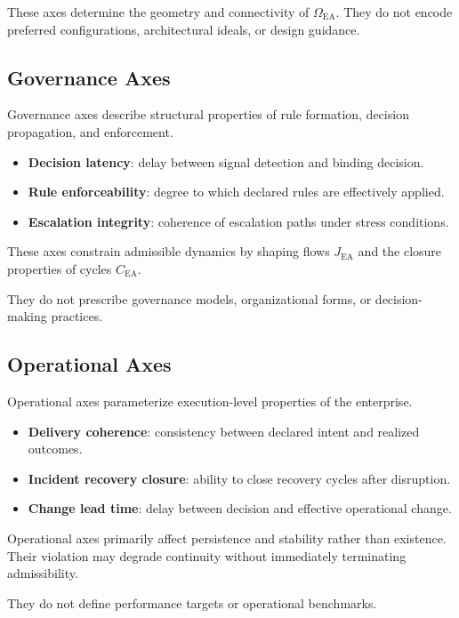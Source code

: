 These axes determine the geometry and connectivity of
$\Omega_{\mathrm{EA}}$.
They do not encode preferred configurations, architectural ideals, or
design guidance.

\subsection{Governance Axes}

Governance axes describe structural properties of rule formation,
decision propagation, and enforcement.

\begin{itemize}
  \item \textbf{Decision latency}: delay between signal detection and
        binding decision.
  \item \textbf{Rule enforceability}: degree to which declared rules are
        effectively applied.
  \item \textbf{Escalation integrity}: coherence of escalation paths
        under stress conditions.
\end{itemize}

These axes constrain admissible dynamics by shaping flows $J_{\mathrm{EA}}$
and the closure properties of cycles $C_{\mathrm{EA}}$.

They do not prescribe governance models, organizational forms, or
decision-making practices.

\subsection{Operational Axes}

Operational axes parameterize execution-level properties of the
enterprise.

\begin{itemize}
  \item \textbf{Delivery coherence}: consistency between declared intent
        and realized outcomes.
  \item \textbf{Incident recovery closure}: ability to close recovery
        cycles after disruption.
  \item \textbf{Change lead time}: delay between decision and effective
        operational change.
\end{itemize}

Operational axes primarily affect persistence and stability rather than
existence.
Their violation may degrade continuity without immediately terminating
admissibility.

They do not define performance targets or operational benchmarks.

